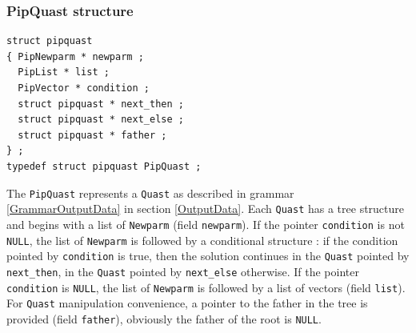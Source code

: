 \documentclass[12pt,a4paper]{article}
\begin{document}
\subsubsection{PipQuast structure}
\begin{verbatim}
struct pipquast
{ PipNewparm * newparm ;
  PipList * list ;
  PipVector * condition ;
  struct pipquast * next_then ;
  struct pipquast * next_else ;
  struct pipquast * father ;
} ;      
typedef struct pipquast PipQuast ;
\end{verbatim}
The {\tt PipQuast} represents a {\tt Quast} as described in
grammar \ref{GrammarOutputData} in section \ref{OutputData}. Each {\tt Quast}
has a tree structure and begins with a list of {\tt Newparm}
(field {\tt newparm}). If the pointer {\tt condition} is not {\tt NULL}, the
list of {\tt Newparm} is followed by a conditional structure : if the condition
pointed by {\tt condition} is true, then the solution continues in the
{\tt Quast} pointed by {\tt next\_then}, in the {\tt Quast} pointed by
{\tt next\_else} otherwise. If the pointer {\tt condition} is {\tt NULL}, the
list of {\tt Newparm} is followed by a list of vectors (field {\tt list}).
For {\tt Quast} manipulation convenience, a pointer to the father in the tree
is provided (field {\tt father}), obviously the father of the root is {\tt NULL}. 
\end{document}
